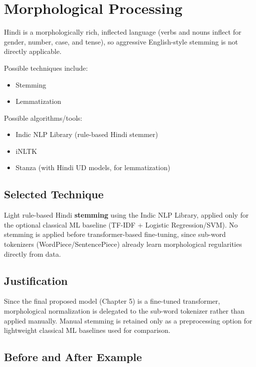 
\section{Morphological Processing}

Hindi is a morphologically rich, inflected language (verbs and nouns inflect for gender, number, case, and tense), so aggressive English-style stemming is not directly applicable.

Possible techniques include:

\begin{itemize}
\item Stemming
\item Lemmatization
\end{itemize}

Possible algorithms/tools:

\begin{itemize}
\item Indic NLP Library (rule-based Hindi stemmer)
\item iNLTK
\item Stanza (with Hindi UD models, for lemmatization)
\end{itemize}

\subsection*{Selected Technique}

Light rule-based Hindi \textbf{stemming} using the Indic NLP Library, applied only for the optional classical ML baseline (TF-IDF + Logistic Regression/SVM). No stemming is applied before transformer-based fine-tuning, since sub-word tokenizers (WordPiece/SentencePiece) already learn morphological regularities directly from data.

\subsection*{Justification}

Since the final proposed model (Chapter 5) is a fine-tuned transformer, morphological normalization is delegated to the sub-word tokenizer rather than applied manually. Manual stemming is retained only as a preprocessing option for lightweight classical ML baselines used for comparison.

\subsection*{Before and After Example}

